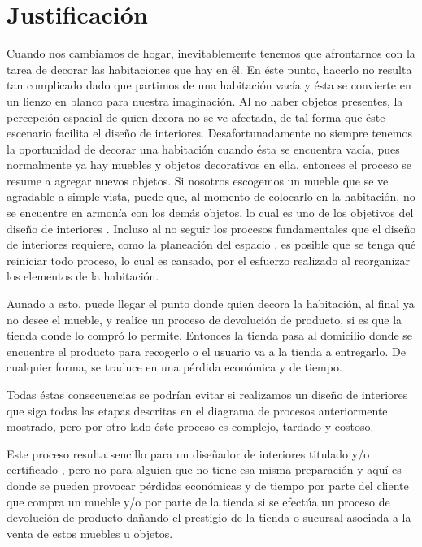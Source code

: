 \section{Justificación}
Cuando nos cambiamos de hogar, inevitablemente tenemos que afrontarnos con la tarea de decorar las habitaciones que hay en él. En éste punto, hacerlo no resulta tan complicado dado que partimos de una habitación vacía y ésta se convierte en un lienzo en blanco para nuestra imaginación. Al no haber objetos presentes, la percepción espacial de quien decora no se ve afectada, de tal forma que éste escenario facilita el diseño de interiores. Desafortunadamente no siempre tenemos la oportunidad de decorar una habitación cuando ésta se encuentra vacía, pues normalmente ya hay muebles y objetos decorativos en ella, entonces el proceso se resume a agregar nuevos objetos. Si nosotros escogemos un mueble que se ve agradable a simple vista, puede que, al momento de colocarlo en la habitación, no se encuentre en armonía con los demás objetos, lo cual es uno de los objetivos del diseño de interiores \cite{B01}. Incluso al no seguir los procesos fundamentales que el diseño de interiores requiere, como la planeación del espacio \cite{B02}, es posible que se tenga qué reiniciar todo proceso, lo cual es cansado, por el esfuerzo realizado al reorganizar los elementos de la habitación.\par 
Aunado a esto, puede llegar el punto donde quien decora la habitación, al final ya no desee el mueble, y realice un proceso de devolución de producto, si es que la tienda donde lo compró lo permite. Entonces la tienda pasa al domicilio donde se encuentre el producto para recogerlo o el usuario va a la tienda a entregarlo. De cualquier forma, se traduce en una pérdida económica y de tiempo.\par 
Todas éstas consecuencias se podrían evitar si realizamos un diseño de interiores que siga todas las etapas descritas en el diagrama de procesos anteriormente mostrado, pero por otro lado éste proceso es complejo, tardado y costoso.\par
Este proceso resulta sencillo para un diseñador de interiores titulado y/o certificado \cite{B02}, pero no para alguien que no tiene esa misma preparación y aquí es donde se pueden provocar pérdidas económicas y de tiempo por parte del cliente que compra un mueble y/o por parte de la tienda si se efectúa un proceso de devolución de producto dañando el prestigio de la tienda o sucursal asociada a la venta de estos muebles u objetos.\par
